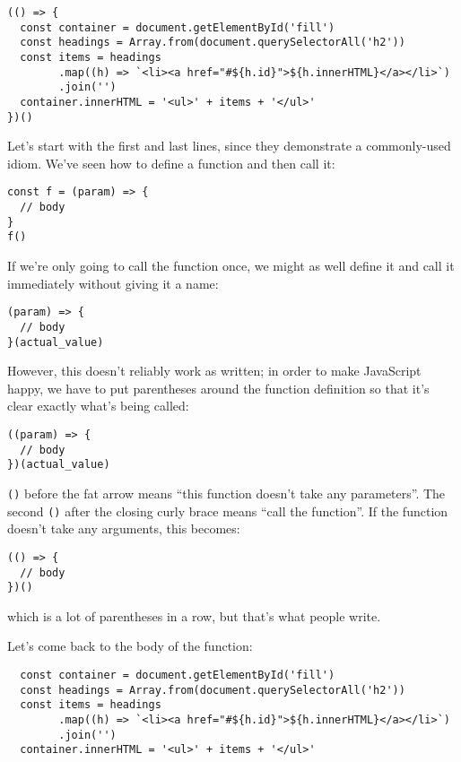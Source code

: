 \begin{verbatim}
(() => {
  const container = document.getElementById('fill')
  const headings = Array.from(document.querySelectorAll('h2'))
  const items = headings
        .map((h) => `<li><a href="#${h.id}">${h.innerHTML}</a></li>`)
        .join('')
  container.innerHTML = '<ul>' + items + '</ul>'
})()
\end{verbatim}

Let's start with the first and last lines,
since they demonstrate a commonly-used idiom.
We've seen how to define a function and then call it:

\begin{verbatim}
const f = (param) => {
  // body
}
f()
\end{verbatim}

If we're only going to call the function once,
we might as well define it and call it immediately without giving it a name:

\begin{verbatim}
(param) => {
  // body
}(actual_value)
\end{verbatim}

\noindent
However,
this doesn't reliably work as written;
in order to make JavaScript happy,
we have to put parentheses around the function definition
so that it's clear exactly what's being called:

\begin{verbatim}
((param) => {
  // body
})(actual_value)
\end{verbatim}

\texttt{()} before the fat arrow means ``this function doesn't take any parameters''.
The second \texttt{()} after the closing curly brace means ``call the function''.
If the function doesn't take any arguments,
this becomes:

\begin{verbatim}
(() => {
  // body
})()
\end{verbatim}

\noindent
which is a lot of parentheses in a row,
but that's what people write.

Let's come back to the body of the function:

\begin{verbatim}
  const container = document.getElementById('fill')
  const headings = Array.from(document.querySelectorAll('h2'))
  const items = headings
        .map((h) => `<li><a href="#${h.id}">${h.innerHTML}</a></li>`)
        .join('')
  container.innerHTML = '<ul>' + items + '</ul>'
\end{verbatim}

